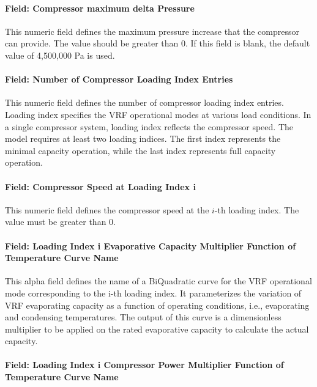 \paragraph{Field: Compressor maximum delta Pressure}\label{field-compressor-maximum-delta-pressure}

This numeric field defines the maximum pressure increase that the compressor can provide. The value should be greater than 0. If this field is blank, the default value of 4,500,000 Pa is used.

\paragraph{Field: Number of Compressor Loading Index Entries}\label{field-number-of-compressor-loading-index-entries}

This numeric field defines the number of compressor loading index entries. Loading index specifies the VRF operational modes at various load conditions. In a single compressor system, loading index reflects the compressor speed. The model requires at least two loading indices. The first index represents the minimal capacity operation, while the last index represents full capacity operation.

\paragraph{Field: Compressor Speed at Loading Index i}\label{field-compressor-speed-at-loading-index-i}

This numeric field defines the compressor speed at the $i$-th loading index. The value must be greater than 0.

\paragraph{Field: Loading Index i Evaporative Capacity Multiplier Function of Temperature Curve Name}\label{field-loading-index-i-evaporative-capacity-multiplier-function-of-temperature-curve-name}

This alpha field defines the name of a BiQuadratic curve for the VRF operational mode corresponding to the i-th loading index. It parameterizes the variation of VRF evaporating capacity as a function of operating conditions, i.e., evaporating and condensing temperatures. The output of this curve is a dimensionless multiplier to be applied on the rated evaporative capacity to calculate the actual capacity.

\paragraph{Field: Loading Index i Compressor Power Multiplier Function of Temperature Curve Name}\label{field-loading-index-i-compressor-power-multiplier-function-of-temperature-curve-name}

